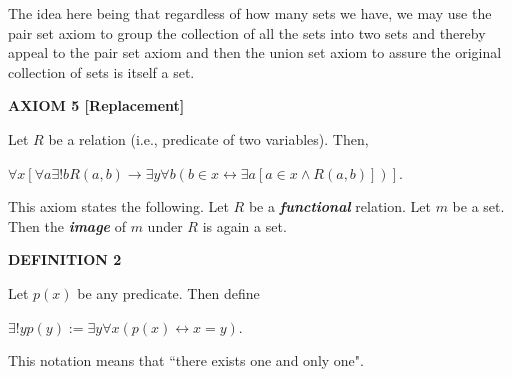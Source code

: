\documentclass[12pt, a4paper]{article}
\begin{document}
\vspace{4mm}

\noindent The idea here being that regardless of how many sets we have, we may use the pair set axiom to group the collection of all the sets into two sets and thereby appeal to the pair set axiom and then the union set axiom to assure the original collection of sets is itself a set.\par

\vspace{10mm}

\noindent\blacksquare\textbf{ AXIOM 5 [Replacement]}\par

\vspace{4mm}

\noindent Let $R$ be a relation (i.e., predicate of two variables). Then,\par

\vspace{4mm}

$\forall x[\forall a\exists! b R(a,b)\rightarrow\exists y\forall b(b\in x\leftrightarrow\exists a[a\in x\wedge R(a,b)])]$.\par

\vspace{4mm}

\noindent This axiom states the following. Let $R$ be a \textbf{\textit{functional}} relation. Let $m$ be a set. Then the \textbf{\textit{image}} of $m$ under $R$ is again a set.\par

\vspace{6mm}

\noindent\textbf{DEFINITION 2}\par

\vspace{4mm}

Let $p(x)$ be any predicate. Then define\par

\vspace{4mm}

\centerline{$\exists!yp(y):=\exists y\forall x(p(x)\leftrightarrow x=y)$.}\par

\vspace{4mm}

\noindent This notation means that ``there exists one and only one".\par

\vspace{6mm}
\end{document}
